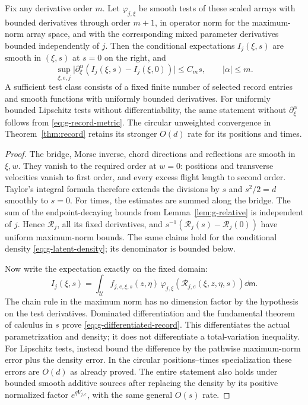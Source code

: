 \begin{proposition}\label{prop:g-smooth-tests}
Fix any derivative order $m$. Let $\varphi_{j,\xi}$ be smooth tests of
these scaled arrays with bounded derivatives through order $m+1$, in
operator norm for the maximum-norm array space, and with the corresponding
mixed parameter derivatives bounded independently of $j$. Then the
conditional expectations $I_j(\xi,s)$ are smooth in $(\xi,s)$ at $s=0$
on the right, and
\begin{equation}\label{eq:g-differentiated-record}
 \sup_{\xi,e,j}\bigl|\partial_\xi^\alpha
                  (I_j(\xi,s)-I_j(\xi,0))\bigr|\le C_m s,
 \qquad |\alpha|\le m.
\end{equation}
A sufficient test class consists of a fixed finite number of selected
record entries and smooth functions with uniformly bounded derivatives.
For uniformly bounded Lipschitz tests without differentiability, the
same statement without $\partial_\xi^\alpha$ follows from
\eqref{eq:g-record-metric}. The circular unweighted convergence in
Theorem~\ref{thm:record} retains its stronger $O(d)$ rate for its
positions and times.
\end{proposition}
\begin{proof}
The bridge, Morse inverse, chord directions and reflections are smooth
in $\xi,w$. They vanish to the required order at $w=0$: positions and
transverse velocities vanish to first order, and every excess flight
length to second order. Taylor's integral formula therefore extends
the divisions by $s$ and $s^2/2=d$ smoothly to $s=0$.
For times, the estimates are summed along the bridge. The sum of the
endpoint-decaying bounds from Lemma~\ref{lem:g-relative} is independent
of $j$. Hence $\mathcal R_j$, all its fixed derivatives, and
$s^{-1}(\mathcal R_j(s)-\mathcal R_j(0))$ have uniform maximum-norm
bounds. The same claims hold for the conditional density
\eqref{eq:g-latent-density}; its denominator is bounded below.

Now write the expectation exactly on the fixed domain:
\[
 I_j(\xi,s)=\int_{\mathcal U}
 f_{j,e,\xi,s}(z,\eta)\,
 \varphi_{j,\xi}(\mathcal R_{j,e}(\xi,z,\eta,s))\dd\mathsf m.
\]
The chain rule in the maximum norm has no dimension factor by the
hypothesis on the test derivatives. Dominated differentiation and the
fundamental theorem of calculus in $s$ prove
\eqref{eq:g-differentiated-record}. This differentiates the actual
parametrization and density; it does not differentiate a total-variation
inequality. For Lipschitz tests, instead bound the difference by the
pathwise maximum-norm error plus the density error. In the circular
positions--times specialization these errors are $O(d)$ as already
proved. The entire statement also holds under bounded smooth additive
sources after replacing the density by its positive normalized factor
$e^{qV_{j,e}}$, with the same general $O(s)$ rate.
\end{proof}

